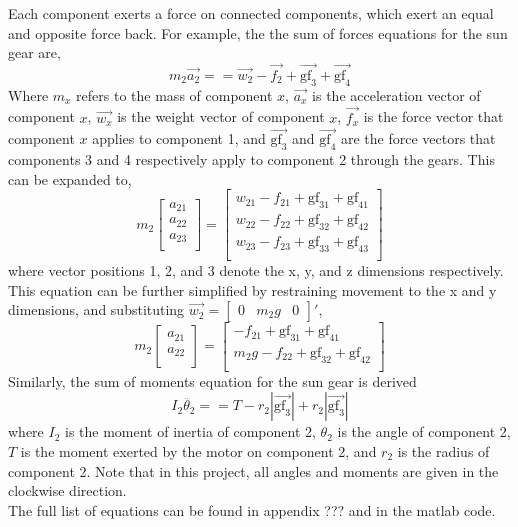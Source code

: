 Each component exerts a force on connected components, which exert an equal and opposite force back.
For example, the the sum of forces equations for the sun gear are,\\
\begin{equation}
	m_2\vec{a_2} == \vec{w_2}-\vec{f_2}+\vec{\mathrm{gf}_3}+\vec{\mathrm{gf}_4}
\end{equation}
Where $m_x$ refers to the mass of component $x$, $\vec{a_x}$ is the acceleration vector of component $x$, $\vec{w_x}$ is the weight vector of component $x$, $\vec{f_x}$ is the force vector that component $x$ applies to component 1,  and $\vec{\mathrm{gf}_3}$ and $\vec{\mathrm{gf}_4}$ are the force vectors that components 3 and 4 respectively apply to component 2 through the gears.
This can be expanded to,
\begin{equation}
	m_2
	\begin{bmatrix}
		a_{21}\\
		a_{22}\\
		a_{23}\\
	\end{bmatrix}
	=
	\begin{bmatrix}
		w_{21}-f_{21}+\mathrm{gf}_{31}+\mathrm{gf}_{41}\\
		w_{22}-f_{22}+\mathrm{gf}_{32}+\mathrm{gf}_{42}\\
		w_{23}-f_{23}+\mathrm{gf}_{33}+\mathrm{gf}_{43}\\
	\end{bmatrix}
\end{equation}
where vector positions 1, 2, and 3 denote the x, y, and z dimensions respectively. This equation can be further simplified by restraining movement to the x and y dimensions, and substituting $\vec{w_2} = \begin{bmatrix} 0 & m_2g & 0 \end{bmatrix}'$,
\begin{equation}
	m_2
	\begin{bmatrix}
		a_{21}\\
		a_{22}\\
	\end{bmatrix}
	=
	\begin{bmatrix}
		-f_{21}+\mathrm{gf}_{31}+\mathrm{gf}_{41}\\
		m_2g-f_{22}+\mathrm{gf}_{32}+\mathrm{gf}_{42}\\
	\end{bmatrix}
\end{equation}
Similarly, the sum of moments equation for the sun gear is derived
\begin{equation}
	I_2\ddot{\theta_2} == T - r_2|\vec{\mathrm{gf}_3}| + r_2|\vec{\mathrm{gf}_3}|
\end{equation}
where $I_2$ is the moment of inertia of component 2, $\theta_2$ is the angle of component 2, $T$ is the moment exerted by the motor on component 2, and $r_2$ is the radius of component 2. Note that in this project, all angles and moments are given in the clockwise direction.
\\
The full list of equations can be found in appendix ??? and in the matlab code.




